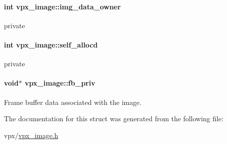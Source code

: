 \paragraph[{\texorpdfstring{img\+\_\+data\+\_\+owner}{img_data_owner}}]{\setlength{\rightskip}{0pt plus 5cm}int vpx\+\_\+image\+::img\+\_\+data\+\_\+owner}\hypertarget{structvpx__image_a4d2c8d41b67f7d3f3114212a8d8afdce}{}\label{structvpx__image_a4d2c8d41b67f7d3f3114212a8d8afdce}
private 
\paragraph[{\texorpdfstring{self\+\_\+allocd}{self_allocd}}]{\setlength{\rightskip}{0pt plus 5cm}int vpx\+\_\+image\+::self\+\_\+allocd}\hypertarget{structvpx__image_a33e8c75d8efc5d4f389e8fc09283a4cc}{}\label{structvpx__image_a33e8c75d8efc5d4f389e8fc09283a4cc}
private 
\paragraph[{\texorpdfstring{fb\+\_\+priv}{fb_priv}}]{\setlength{\rightskip}{0pt plus 5cm}void$\ast$ vpx\+\_\+image\+::fb\+\_\+priv}\hypertarget{structvpx__image_a4b138b7d146dc75ef5d8947d421b0533}{}\label{structvpx__image_a4b138b7d146dc75ef5d8947d421b0533}
Frame buffer data associated with the image. 

The documentation for this struct was generated from the following file\+:\begin{DoxyCompactItemize}
\item 
vpx/\hyperlink{vpx__image_8h}{vpx\+\_\+image.\+h}\end{DoxyCompactItemize}
